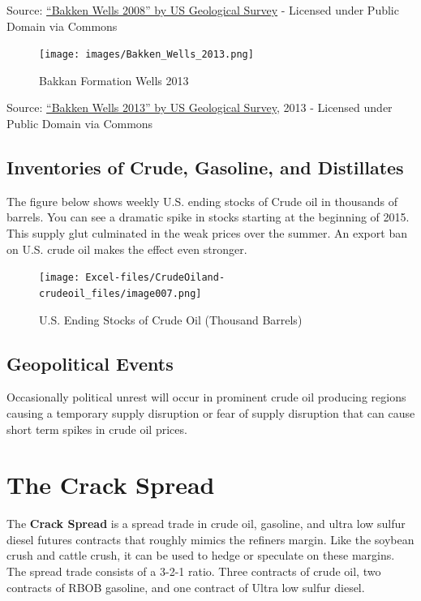 \documentclass[
]{book}
\begin{document}
Source: \href{https://commons.wikimedia.org/wiki/File:Bakken_Wells_2008.png\#/media/File:Bakken_Wells_2008.png}{``Bakken Wells 2008'' by US Geological Survey} - Licensed under Public Domain via Commons

\begin{figure}
\centering
\texttt{[image: images/Bakken\_Wells\_2013.png]}
\caption{Bakkan Formation Wells 2013}
\end{figure}

Source: \href{https://commons.wikimedia.org/wiki/File:Bakken_Wells_2013.png\#/media/File:Bakken_Wells_2013.png}{``Bakken Wells 2013'' by US Geological Survey}, 2013 - Licensed under Public Domain via Commons

\hypertarget{inventories-of-crude-gasoline-and-distillates}{%
\subsection{Inventories of Crude, Gasoline, and Distillates}\label{inventories-of-crude-gasoline-and-distillates}}

The figure below shows weekly U.S. ending stocks of Crude oil in thousands of barrels. You can see a dramatic spike in stocks starting at the beginning of 2015. This supply glut culminated in the weak prices over the summer. An export ban on U.S. crude oil makes the effect even stronger.

\begin{figure}
\centering
\texttt{[image: Excel-files/CrudeOiland-crudeoil\_files/image007.png]}
\caption{U.S. Ending Stocks of Crude Oil (Thousand Barrels)}
\end{figure}

\hypertarget{geopolitical-events}{%
\subsection{Geopolitical Events}\label{geopolitical-events}}

Occasionally political unrest will occur in prominent crude oil producing regions causing a temporary supply disruption or fear of supply disruption that can cause short term spikes in crude oil prices.

\hypertarget{the-crack-spread}{%
\section{The Crack Spread}\label{the-crack-spread}}

The \textbf{Crack Spread} is a spread trade in crude oil, gasoline, and ultra low sulfur diesel futures contracts that roughly mimics the refiners margin. Like the soybean crush and cattle crush, it can be used to hedge or speculate on these margins. The spread trade consists of a 3-2-1 ratio. Three contracts of crude oil, two contracts of RBOB gasoline, and one contract of Ultra low sulfur diesel.
\end{document}
